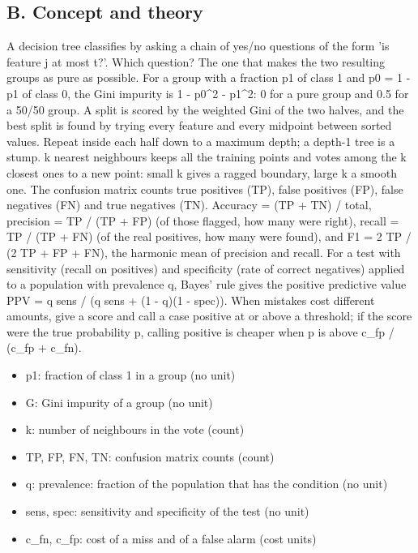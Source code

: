 \documentclass[11pt,a4paper]{article}
\begin{document}
\subsection*{B. Concept and theory}
A decision tree classifies by asking a chain of yes/no questions of the form 'is feature j at most t?'. Which question? The one that makes the two resulting groups as pure as possible. For a group with a fraction p1 of class 1 and p0 = 1 - p1 of class 0, the Gini impurity is 1 - p0\textasciicircum{}2 - p1\textasciicircum{}2: 0 for a pure group and 0.5 for a 50/50 group. A split is scored by the weighted Gini of the two halves, and the best split is found by trying every feature and every midpoint between sorted values. Repeat inside each half down to a maximum depth; a depth-1 tree is a stump. k nearest neighbours keeps all the training points and votes among the k closest ones to a new point: small k gives a ragged boundary, large k a smooth one. The confusion matrix counts true positives (TP), false positives (FP), false negatives (FN) and true negatives (TN). Accuracy = (TP + TN) / total, precision = TP / (TP + FP) (of those flagged, how many were right), recall = TP / (TP + FN) (of the real positives, how many were found), and F1 = 2 TP / (2 TP + FP + FN), the harmonic mean of precision and recall. For a test with sensitivity (recall on positives) and specificity (rate of correct negatives) applied to a population with prevalence q, Bayes' rule gives the positive predictive value PPV = q sens / (q sens + (1 - q)(1 - spec)). When mistakes cost different amounts, give a score and call a case positive at or above a threshold; if the score were the true probability p, calling positive is cheaper when p is above c\_fp / (c\_fp + c\_fn).

\begin{itemize}[nosep]
\item p1: fraction of class 1 in a group (no unit)
\item G: Gini impurity of a group (no unit)
\item k: number of neighbours in the vote (count)
\item TP, FP, FN, TN: confusion matrix counts (count)
\item q: prevalence: fraction of the population that has the condition (no unit)
\item sens, spec: sensitivity and specificity of the test (no unit)
\item c\_fn, c\_fp: cost of a miss and of a false alarm (cost units)
\end{itemize}
\end{document}
